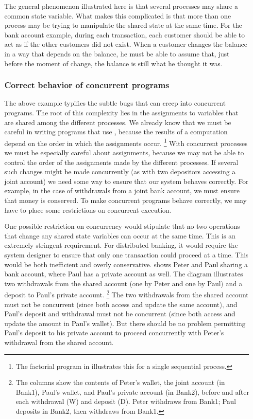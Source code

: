The general phenomenon illustrated here is that several processes may share a common state variable.
What makes this complicated is that more than one process may be trying to manipulate the shared state at the same time.
For the bank account example, during each transaction, each customer should be able to act as if the other customers did not exist.
When a customer changes the balance in a way that depends on the balance, he must be able to assume that, just before the moment of change, the balance is still what he thought it was.



\subsubsection*{Correct behavior of concurrent programs}

The above example typifies the subtle bugs that can creep into concurrent programs.
The root of this complexity lies in the assignments to variables that are shared among the different processes.
We already know that we must be careful in writing programs that use , because the results of a computation depend on the order in which the assignments occur.%
\footnote{
	The factorial program in  illustrates this for a single sequential process.
}
With concurrent processes we must be especially careful about assignments, because we may not be able to control the order of the assignments made by the different processes.
If several such changes might be made concurrently (as with two depositors accessing a joint account) we need some way to ensure that our system behaves correctly.
For example, in the case of withdrawals from a joint bank account, we must ensure that money is conserved.
To make concurrent programs behave correctly, we may have to place some restrictions on concurrent execution.

One possible restriction on concurrency would stipulate that no two operations that change any shared state variables can occur at the same time.
This is an extremely stringent requirement.
For distributed banking, it would require the system designer to ensure that only one transaction could proceed at a time.
This would be both inefficient and overly conservative.
 shows Peter and Paul sharing a bank account, where Paul has a private account as well.
The diagram illustrates two withdrawals from the shared account (one by Peter and one by Paul) and a deposit to Paul’s private account.%
\footnote{
	The columns show the contents of Peter’s wallet, the joint account (in Bank1), Paul’s wallet, and Paul’s private account (in Bank2), before and after each withdrawal (W) and deposit (D).
	Peter withdraws  from Bank1;
	Paul deposits  in Bank2, then withdraws  from Bank1.
}
The two withdrawals from the shared account must not be concurrent (since both access and update the same account), and Paul’s deposit and withdrawal must not be concurrent (since both access and update the amount in Paul’s wallet).
But there should be no problem permitting Paul’s deposit to his private account to proceed concurrently with Peter’s withdrawal from the shared account.

